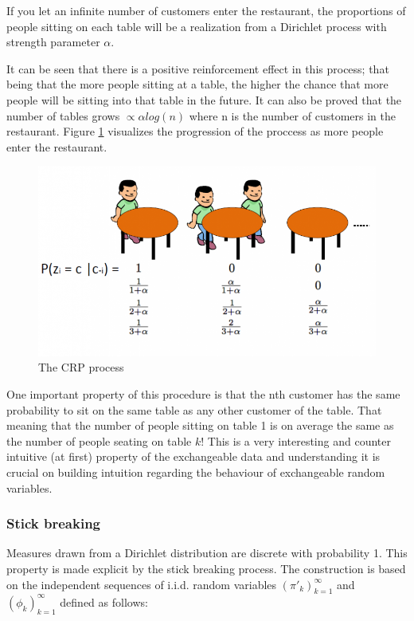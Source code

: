 \documentclass [twoside,hidelinks]{article}
\begin{document}
If you let an infinite number of customers enter the restaurant, the proportions of people sitting on each table will be a realization from a Dirichlet process with strength parameter $\alpha$.

It can be seen that there is a positive reinforcement effect in this process; that being that the more people sitting at a table, the higher the chance that more people will be sitting into that table in the future. It can also be proved that the number of tables grows $ \propto \alpha log (n)$ where n is the number of customers in the restaurant. Figure \ref{CRP} visualizes the progression of the proccess as more people enter the restaurant. 

\begin{figure} [!h]
          \centerline{\includegraphics [width=.70\textwidth]{crp}}
	\caption{The CRP process}
	\label{CRP}
\end{figure}


One important property of this procedure is that the nth customer has the same probability to sit on the same table as any other customer of the table. That meaning that the number of people sitting on table 1 is on average the same as the number of people seating on table $k$! This is a very interesting and counter intuitive (at first) property of the exchangeable data and understanding it is crucial on building intuition regarding the behaviour of exchangeable random variables.

\subsubsection{Stick breaking}

Measures drawn from a Dirichlet distribution are discrete with probability 1. This property is made explicit by the stick breaking process. The construction is based on the independent sequences of i.i.d. random variables $ (\pi'_k)_{k=1}^\infty$ and $  ( \phi_k)_{k=1}^\infty$  defined as follows:
\end{document}
